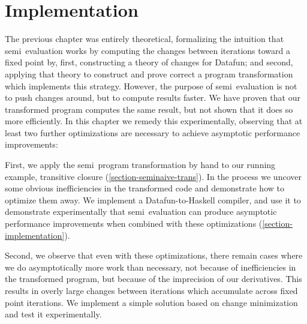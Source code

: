 \chapter{Implementation}

\newcommand\deep{\mathvar{dp}}

The previous chapter was entirely theoretical, formalizing the intuition that
semi\naive\ evaluation works by computing the changes between iterations toward
a fixed point by, first, constructing a theory of changes for Datafun; and
second, applying that theory to construct and prove correct a program
transformation which implements this strategy. However, the purpose of
semi\naive\ evaluation is not to push changes around, but to compute results
faster. We have proven that our transformed program computes the same result,
but not shown that it does so more efficiently.
%
In this chapter we remedy this experimentally, observing that at least two
further optimizations are necessary to achieve asymptotic performance
improvements:


First, we apply the semi\naive\ program transformation by hand to our running
example, transitive closure (\cref{section-seminaive-trans}).
%
In the process we uncover some obvious inefficiencies in the transformed code
and demonstrate how to optimize them away.
%
We implement a Datafun-to-Haskell compiler, and use it to demonstrate
experimentally that semi\naive\ evaluation can produce asymptotic performance
improvements when combined with these optimizations (\cref{section-implementation}).

Second, we observe that even with these optimizations, there remain
cases where we do asymptotically more work than necessary, not because of
inefficiencies in the transformed program, but because of the imprecision of our
derivatives. This results in overly large changes between iterations which
accumulate across fixed point iterations. We implement a
simple solution based on change minimization and test it experimentally.





